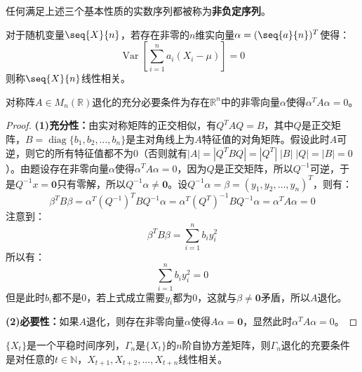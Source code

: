 \begin{definition}
	任何满足上述三个基本性质的实数序列都被称为\textbf{非负定序列}。
\end{definition}
\begin{definition}\label{def:RVLinearlyDependent}
	对于随机变量$\seq{X}{n}$，若存在非零的$n$维实向量$\alpha=(\seq{a}{n})^T$使得：
	\begin{equation*}
		\operatorname{Var}\left[\sum_{i=1}^{n}a_i(X_i-\mu)\right]=0
	\end{equation*}
	则称$\seq{X}{n}$线性相关。
\end{definition}
\begin{lemma}\label{lem:aTaInvertible}
	对称阵$A\in M_{n}(\mathbb{R})$退化的充分必要条件为存在$\mathbb{R}^{n}$中的非零向量$\alpha$使得$\alpha^TA\alpha=0$。
\end{lemma}
\begin{proof}
	\textbf{(1)充分性：}由实对称矩阵的正交相似，有$Q^TAQ=B$，其中$Q$是正交矩阵，$B=\operatorname{diag}\{b_1,b_2,\dots,b_n\}$是主对角线上为$A$特征值的对角矩阵。假设此时$A$可逆，则它的所有特征值都不为$0$（否则就有$|A|=|Q^TBQ|=|Q^T|\;|B|\;|Q|=|B|=0$）。由题设存在非零向量$\alpha$使得$\alpha^TA\alpha=0$，因为$Q$是正交矩阵，所以$Q^{-1}$可逆，于是$Q^{-1}x=\mathbf{0}$只有零解，所以$Q^{-1}\alpha\ne\mathbf{0}$。设$Q^{-1}\alpha=\beta=(y_1,y_2,\dots,y_n)^T$，则有：
	\begin{equation*}
		\beta^TB\beta=\alpha^T(Q^{-1})^TBQ^{-1}\alpha=\alpha^T(Q^T)^{-1}BQ^{-1}\alpha=\alpha^TA\alpha=0
	\end{equation*}
	注意到：
	\begin{equation*}
		\beta^TB\beta=\sum_{i=1}^{n}b_iy_i^2
	\end{equation*}
	所以有：
	\begin{equation*}
		\sum_{i=1}^{n}b_iy_i^2=0
	\end{equation*}
	但是此时$b_i$都不是$0$，若上式成立需要$y_i$都为$0$，这就与$\beta\ne\mathbf{0}$矛盾，所以$A$退化。\par
	\textbf{(2)必要性：}如果$A$退化，则存在非零向量$\alpha$使得$A\alpha=\mathbf{0}$，显然此时$\alpha^TA\alpha=0$。
\end{proof}
\begin{theorem}\label{theo:TSLinearlyIndependent}
	$\{X_t\}$是一个平稳时间序列，$\Gamma_n$是$\{X_t\}$的$n$阶自协方差矩阵，则$\Gamma_n$退化的充要条件是对任意的$t\in\mathbb{N}$，$X_{t+1},X_{t+2},\dots,X_{t+n}$线性相关。
\end{theorem}
